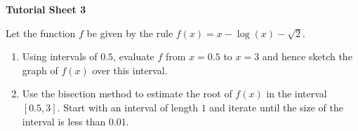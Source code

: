 \documentclass[11pt,a4paper,titlepage,oneside,openany]{article}
\numberwithin{equation}{section}
\numberwithin{algorithm}{section}
\numberwithin{figure}{section}
\numberwithin{table}{section}
\begin{document}
\begin{landscape}
\begin{center}
  \textbf{Tutorial Sheet 3}
\end{center}


Let the function $f$ be given by the rule $f(x)=x-\log(x)-\sqrt{2}$.
\begin{enumerate}

\item
  Using intervals of $0.5$, evaluate $f$ from $x=0.5$ to $x=3$ and hence sketch the graph of $f(x)$ over this interval.

\item 
  Use the bisection method to estimate the root of $f(x)$ in the interval $[0.5,3]$. Start with an interval of length $1$ and iterate until the size of the interval is less than $0.01$.


\end{enumerate}
\end{landscape}
\end{document}
